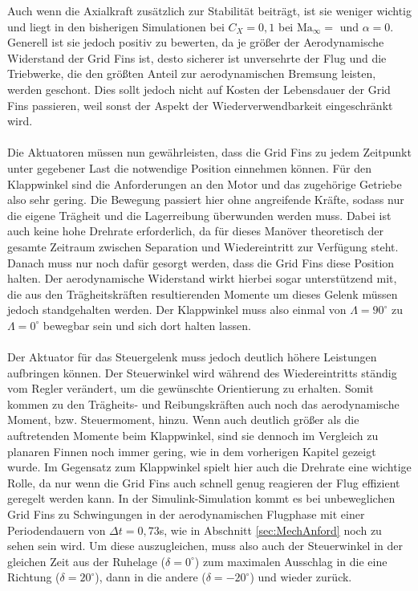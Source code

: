 Auch wenn die Axialkraft zusätzlich zur Stabilität beiträgt, ist sie weniger wichtig und liegt in den bisherigen Simulationen bei $C_X=0,1$ bei $\mathrm{Ma}_\infty=$ und $\alpha=0$. Generell ist sie jedoch positiv zu bewerten, da je größer der Aerodynamische Widerstand der Grid Fins ist, desto sicherer ist unversehrte der Flug und die Triebwerke, die den größten Anteil zur aerodynamischen Bremsung leisten, werden geschont. Dies sollt jedoch nicht auf Kosten der Lebensdauer der Grid Fins passieren, weil sonst der Aspekt der Wiederverwendbarkeit eingeschränkt wird.
\\~\\
Die Aktuatoren müssen nun gewährleisten, dass die Grid Fins zu jedem Zeitpunkt unter gegebener Last die notwendige Position einnehmen können. Für den Klappwinkel sind die Anforderungen an den Motor und das zugehörige Getriebe also sehr gering. Die Bewegung passiert hier ohne angreifende Kräfte, sodass nur die eigene Trägheit und die Lagerreibung überwunden werden muss. Dabei ist auch keine hohe Drehrate erforderlich, da für dieses Manöver theoretisch der gesamte Zeitraum zwischen Separation und Wiedereintritt zur Verfügung steht. Danach muss nur noch dafür gesorgt werden, dass die Grid Fins diese Position halten. Der aerodynamische Widerstand wirkt hierbei sogar unterstützend mit, die aus den Trägheitskräften resultierenden Momente um dieses Gelenk müssen jedoch standgehalten werden.
Der Klappwinkel muss also einmal von $\Lambda=90^\circ$ zu $\Lambda=0^\circ$ bewegbar sein und sich dort halten lassen.
\\~\\
Der Aktuator für das Steuergelenk muss jedoch deutlich höhere Leistungen aufbringen können. Der Steuerwinkel wird während des Wiedereintritts ständig vom Regler verändert, um die gewünschte Orientierung zu erhalten. Somit kommen zu den Trägheits- und Reibungskräften auch noch das aerodynamische Moment, bzw. Steuermoment, hinzu. Wenn auch deutlich größer als die auftretenden Momente beim Klappwinkel, sind sie dennoch im Vergleich zu planaren Finnen noch immer gering, wie in dem vorherigen Kapitel gezeigt wurde. Im Gegensatz zum Klappwinkel spielt hier auch die Drehrate eine wichtige Rolle, da nur wenn die Grid Fins auch schnell genug reagieren der Flug effizient geregelt werden kann. In der Simulink-Simulation kommt es bei unbeweglichen Grid Fins zu Schwingungen in der aerodynamischen Flugphase mit einer Periodendauern von $\Delta t=0,73$s, wie in Abschnitt \ref{sec:MechAnford} noch zu sehen sein wird. Um diese auszugleichen, muss also auch der Steuerwinkel in der gleichen Zeit aus der Ruhelage ($\delta = 0^\circ$) zum maximalen Ausschlag in die eine Richtung ($\delta = 20^\circ$), dann in die andere ($\delta = -20^\circ$) und wieder zurück.
